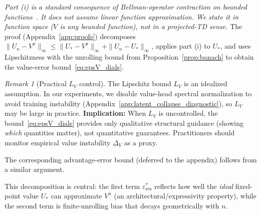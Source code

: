 \documentclass{article}
\theoremstyle{plain}
\theoremstyle{definition}
\theoremstyle{remark}
\newtheorem{remark}[theorem]{Remark}
\newcommand{\shortonly}[1]{#1}
\newcommand{\longonly}[1]{}
\newcommand{\shortonly}[1]{}
\newcommand{\longonly}[1]{#1}
\begin{document}
\emph{Part (i) is a standard consequence of Bellman-operator contraction on bounded functions~\citep{Puterman1994,daley2025multistep}. It does not assume linear function approximation. We state it in function space ($V$ is any bounded function), not in a projected-TD sense.}
The proof (Appendix~\ref{app:proofs}) decomposes $\|U_n - V^\pi\|_\infty \le \|U_* - V^\pi\|_\infty + \|U_n - U_*\|_\infty$, applies part (i) to $U_*$, and uses Lipschitzness with the unrolling bound from Proposition~\ref{prop:banach} to obtain the value-error bound~\eqref{eq:epsV_dials}.

\begin{remark}[Practical $L_V$ control]
\label{rem:LV_practical}
The Lipschitz bound $L_V$ is an idealized assumption. In our experiments, we disable value-head spectral normalization to avoid training instability (Appendix~\ref{app:latent_collapse_diagnostic}), so $L_V$ may be large in practice. 
\textbf{Implication:} When $L_V$ is uncontrolled, the bound~\eqref{eq:epsV_dials} provides only qualitative structural guidance (showing \emph{which} quantities matter), not quantitative guarantees. Practitioners should monitor empirical value instability $\Delta_V$ as a proxy.
\end{remark}
\longonly{The corresponding advantage-error bound is obtained by combining~\eqref{eq:epsV_dials} with Lemma~\ref{lem:A_error}, yielding Corollary~\ref{cor:epsA_dials}.}%
\shortonly{The corresponding advantage-error bound (deferred to the appendix) follows from a similar argument.}

This decomposition is central: the first term $\varepsilon_{\mathrm{res}}^*$ reflects how well the \emph{ideal} fixed-point value $U_*$ can approximate $V^\pi$ (an architectural/expressivity property), while the second term is finite-unrolling bias that decays geometrically with $n$.

\longonly{
The \emph{coefficient} $(1-\gamma^K)^{-1}$ decreases with $K$ and satisfies $(1-\gamma^K)^{-1} \le (1-\gamma)^{-1}$.
Thus, \emph{holding the $K$-step residual} $\|V-\mathcal{T}_K^\pi V\|_\infty$ fixed (or comparable across $K$), using a larger $K$ tightens the bound.
However, the residual itself depends on $K$ (e.g., $\varepsilon_{\mathrm{res}}^*(K)=\|U_*-\mathcal{T}_K^\pi U_*\|_\infty$) and need not decrease monotonically with $K$.
In practice, increasing $K$ also increases the \emph{variance} of the rollout return $G^{(K)}$, necessitating a bias-variance trade-off not captured by sup-norm analysis.}
\end{document}
